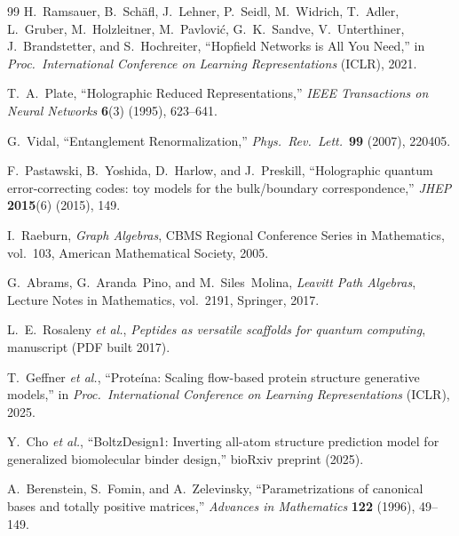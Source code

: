 \documentclass[11pt,oneside]{amsbook}
\numberwithin{equation}{section}
\theoremstyle{plain}
\theoremstyle{definition}
\theoremstyle{remark}
\begin{document}
\begin{thebibliography}{99}
H.~Ramsauer, B.~Sch\"afl, J.~Lehner, P.~Seidl, M.~Widrich, T.~Adler, L.~Gruber, M.~Holzleitner, M.~Pavlovi\'c, G.~K.~Sandve, V.~Unterthiner, J.~Brandstetter, and S.~Hochreiter,
\newblock ``Hopfield Networks is All You Need,''
\newblock in \emph{Proc.\ International Conference on Learning Representations} (ICLR), 2021.

T.~A.~Plate,
\newblock ``Holographic Reduced Representations,''
\newblock \emph{IEEE Transactions on Neural Networks} \textbf{6}(3) (1995), 623--641.

G.~Vidal,
\newblock ``Entanglement Renormalization,''
\newblock \emph{Phys.\ Rev.\ Lett.}\ \textbf{99} (2007), 220405.

F.~Pastawski, B.~Yoshida, D.~Harlow, and J.~Preskill,
\newblock ``Holographic quantum error-correcting codes: toy models for the bulk/boundary correspondence,''
\newblock \emph{JHEP} \textbf{2015}(6) (2015), 149.



I.~Raeburn,
\newblock \emph{Graph Algebras},
\newblock CBMS Regional Conference Series in Mathematics, vol.~103, American Mathematical Society, 2005.

G.~Abrams, G.~Aranda~Pino, and M.~Siles~Molina,
\newblock \emph{Leavitt Path Algebras},
\newblock Lecture Notes in Mathematics, vol.~2191, Springer, 2017.

L.~E.~Rosaleny \emph{et al.},
\newblock \emph{Peptides as versatile scaffolds for quantum computing},
\newblock manuscript (PDF built 2017).

T.~Geffner \emph{et al.},
\newblock ``Prote\'{i}na: Scaling flow-based protein structure generative models,''
\newblock in \emph{Proc.\ International Conference on Learning Representations} (ICLR), 2025.

Y.~Cho \emph{et al.},
\newblock ``BoltzDesign1: Inverting all-atom structure prediction model for generalized biomolecular binder design,''
\newblock bioRxiv preprint (2025).




A.~Berenstein, S.~Fomin, and A.~Zelevinsky,
\newblock ``Parametrizations of canonical bases and totally positive matrices,''
\newblock \emph{Advances in Mathematics} \textbf{122} (1996), 49--149.


\end{thebibliography}
\end{document}
